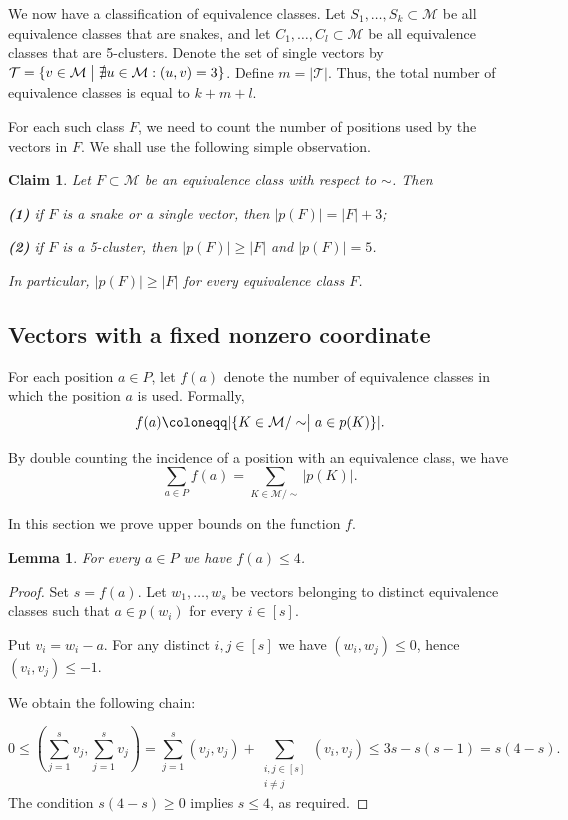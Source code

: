 \documentclass[12pt,a4paper]{article}
\newcommand{\M}{\mathcal{M}}
\newcommand{\T}{\mathcal{T}}
\newtheorem{lemma}[theorem]{Lemma}
\newtheorem{claim}[theorem]{Claim}
\begin{document}
We now have a classification of equivalence classes. Let
$S_1,\ldots,S_k \subset \M$ be all equivalence classes that are snakes, and let $C_1,\ldots,C_l \subset \M$ be all equivalence classes that are 5-clusters. Denote the set of single vectors by $\T = \{ v \in \M \bigm| \nexists u \in \M: (u,v) = 3 \}$. Define $m = |\T|$. Thus, the total number of equivalence classes is equal to $k+m+l$.

For each such class $F$, we need to count the number of positions used by the vectors in $F$. We shall use the following simple observation.

\begin{claim}\label{cla23}
    Let $F \subset \M$ be an equivalence class with respect to $\sim$. Then

    {\bf (1)} if $F$ is a snake or a single vector, then $|p(F)| = |F| + 3$;

    {\bf (2)} if $F$ is a 5-cluster, then $|p(F)| \geqslant |F|$ and $|p(F)| = 5$.

    In particular, $|p(F)| \geqslant |F|$ for every equivalence class $F$.
\end{claim}

\subsection{Vectors with a fixed nonzero coordinate}

For each position $a \in P$, let $f(a)$ denote the number of equivalence classes in which the position $a$ is used. Formally,
$$f(a) \coloneqq |\{K \in \M/\sim \bigm| a \in p(K)\}|.$$

By double counting the incidence of a position with an equivalence class, we have
\begin{equation}\label{dc}
    \sum_{a \in P} f(a) = \sum_{K \in \M/\sim} |p(K)|.
\end{equation}

In this section we prove upper bounds on the function $f$.

\begin{lemma}\label{lem31}
    For every $a \in P$ we have $f(a) \leqslant 4$.
\end{lemma}

\begin{proof}

Set $s=f(a)$. Let $w_1, \dots, w_s$ be vectors belonging to distinct equivalence classes such that $a \in p(w_i)$ for every $i \in [s]$.

Put $v_i = w_i - a$. For any distinct $i,j \in [s]$ we have $(w_i, w_j) \leqslant 0$, hence $(v_i, v_j) \leqslant -1$.

We obtain the following chain:

\begin{equation}\label{eq2}
    0 \leqslant \left(\sum_{j = 1}^s v_j, \sum_{j = 1}^s v_j\right) = \sum_{j = 1}^s (v_j, v_j) + \sum_{\substack{i, j \in [s] \\ i \not= j}} (v_{i}, v_{j}) \leqslant 3s - s(s-1) = s(4-s).
\end{equation}
The condition $s(4-s) \geqslant 0$ implies $s \leqslant 4$, as required.

\end{proof}
\end{document}
